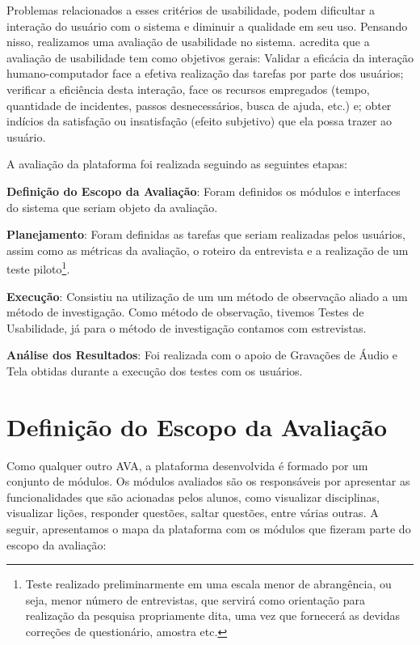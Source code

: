 Problemas relacionados a esses crit\'erios de usabilidade, podem dificultar a intera\c{c}\~ao do usu\'ario com o sistema e diminuir a 
qualidade em seu uso. Pensando nisso, realizamos uma avalia\c{c}\~ao de usabilidade no sistema.  acredita que a avalia\c{c}\~ao de usabilidade tem como objetivos gerais: Validar a eficácia da interação humano-computador face a efetiva realização das tarefas por parte dos usuários; verificar a eficiência desta interação, face os recursos empregados (tempo, quantidade de incidentes, passos desnecessários, 
busca de ajuda, etc.) e; obter indícios da satisfação ou insatisfação (efeito subjetivo) que ela possa trazer ao usuário.

A avaliação da plataforma foi realizada seguindo as seguintes etapas:

\begin{alineascomnumero}
	\item \textbf{Definição do Escopo da Avaliação}: Foram definidos os módulos e interfaces do sistema que seriam objeto da avaliação.
	\item \textbf{Planejamento}: Foram definidas as tarefas que seriam realizadas pelos usuários, assim como as métricas da avaliação, o roteiro da entrevista e a realização de um teste piloto\footnote{Teste realizado preliminarmente em uma escala menor de abrangência, ou seja, menor número de entrevistas, que servirá como orientação para realização da pesquisa propriamente dita, uma vez que fornecerá as devidas correções de questionário, amostra etc.}. 
	\item \textbf{Execução}: Consistiu na utilização de um um método de observação aliado a um método de investigação. Como método de observação, tivemos Testes de Usabilidade, já para o método de investigação contamos com estrevistas.
	\item \textbf{An\'alise dos Resultados}: Foi realizada com o apoio de Gravações de Áudio e Tela obtidas durante a execução dos testes com os usuários.
\end{alineascomnumero}

\section{Definição do Escopo da Avalia\c{c}\~ao}
Como qualquer outro AVA, a plataforma desenvolvida é formado por um conjunto de módulos. Os módulos avaliados são os responsáveis por apresentar as funcionalidades que são acionadas pelos alunos, como visualizar disciplinas, visualizar lições, responder questões, saltar questões, entre várias outras. A seguir, apresentamos o mapa da plataforma com os módulos que fizeram parte do escopo da avaliação:

